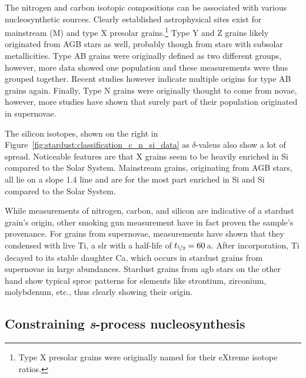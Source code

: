 The nitrogen and carbon isotopic compositions can be associated with various nucleosynthetic sources. Clearly established astrophysical sites exist for mainstream (M) and type X presolar grains.\footnote{Type X presolar grains were originally named for their eXtreme isotope ratios.} Type Y and Z grains likely originated from AGB stars as well, probably though from stars with subsolar metallicities. Type AB grains were originally defined as two different groups, however, more data showed one population and these measurements were thus grouped together. Recent studies however indicate multiple origins for type AB grains again. Finally, Type N grains were originally thought to come from novae, however, more studies have shown that surely part of their population originated in supernovae. 

The silicon isotopes, shown on the right in Figure~\ref{fig:stardust:classification_c_n_si_data} as $\delta$-valeus also show a lot of spread. Noticeable features are that X grains seem to be heavily enriched in Si compared to the Solar System. Mainstream grains, originating from AGB stars, all lie on a slope 1.4 line and are for the most part enriched in Si and Si compared to the Solar System.

While measurements of nitrogen, carbon, and silicon are indicative of a stardust grain's origin, other smoking gun measurement have in fact proven the sample's provenance. For grains from supernovae, measurements have shown that they condensed with live Ti, a \ac{slr} with a half-life of $t_{\nicefrac{1}{2}} = 60$\,a. After incorporation, Ti decayed to its stable daughter Ca, which occurs in stardust grains from supernovae in large abundances. Stardust grains from \ac{agb} stars on the other hand show typical \ac{sproc} patterns for elements like strontium, zirconium, molybdenum, etc., thus clearly showing their origin.



\subsection{Constraining \textit{s}-process nucleosynthesis}

